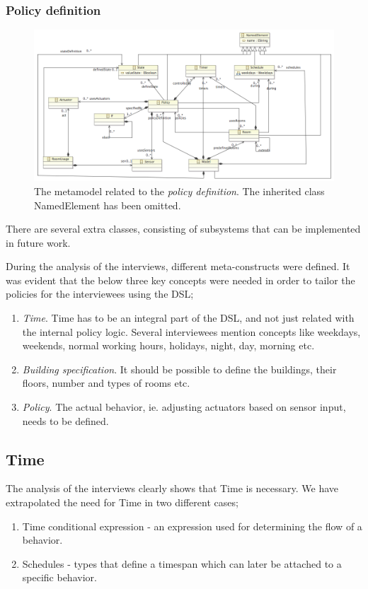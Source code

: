 \documentclass{llncs}
\begin{document}
\subsubsection{Policy definition}
\begin{figure}
  \centering
    \includegraphics[scale=0.3]{ecore-policy-definition.png}	
	\caption{The metamodel related to the \textit{policy definition}. The inherited class NamedElement has been omitted.}
	\label{fig:ecore-policy-definition}
\end{figure}

\pagebreak
There are several extra classes, consisting of subsystems that can be implemented in future work.

During the analysis of the interviews, different meta-constructs were defined. It was evident that the below three key concepts were needed in order to tailor the policies for the interviewees using the DSL;

\begin{enumerate}
	\item \textit{Time}. Time has to be an integral part of the DSL, and not just related with the internal policy logic. Several interviewees mention concepts like weekdays, weekends, normal working hours, holidays, night, day, morning etc.
	
	\item \textit{Building specification}. It should be possible to define the buildings, their floors, number and types of rooms etc.

	\item \textit{Policy}. The actual behavior, ie. adjusting actuators based on sensor input, needs to be defined. 
\end{enumerate}

\subsection{Time}\label{subsec:time}
The analysis of the interviews clearly shows that Time is necessary. We have extrapolated the need for Time in two different cases;
	\begin{enumerate}
		\item Time conditional expression - an expression used for determining the flow of a behavior.
		\item Schedules - types that define a timespan which can later be attached to a specific behavior.
	\end{enumerate}
\end{document}
